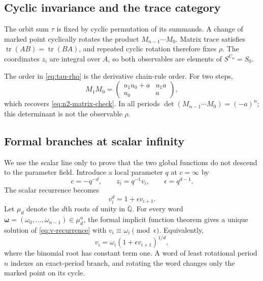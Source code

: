 \documentclass[11pt]{article}
\theoremstyle{definition}
\theoremstyle{remark}
\newcommand{\Qbar}{\overline{\mathbb{Q}}}
\newcommand{\bw}{\boldsymbol{\omega}}
\begin{document}
\subsection{Cyclic invariance and the trace category}

The orbit sum $\tau$ is fixed by cyclic permutation of its summands.  A
change of marked point cyclically rotates the product
$M_{n-1}\cdots M_0$.  Matrix trace satisfies
$\operatorname{tr}(AB)=\operatorname{tr}(BA)$, and repeated cyclic rotation
therefore fixes $\rho$.  The coordinates $z_i$ are integral over $A$, so
both observables are elements of $S^{C_n}=S_0$.

The order in \eqref{eq:tau-rho} is the derivative chain-rule order.  For two
steps,
\[
 M_1M_0=
 \begin{pmatrix}
   u_1u_0+a&u_1a\\
   u_0&a
 \end{pmatrix},
\]
which recovers \eqref{eq:n2-matrix-check}.  In all periods
$\det(M_{n-1}\cdots M_0)=(-a)^n$; this determinant is not the observable
$\rho$.

\subsection{Formal branches at scalar infinity}

We use the scalar line only to prove that the two global functions do not
descend to the parameter field.  Introduce a local parameter $q$ at
$c=\infty$ by
\begin{equation}\label{eq:infinity-substitution}
 c=-q^{-d},\qquad z_i=q^{-1}v_i,\qquad
 \epsilon=q^{d-1}.
\end{equation}
The scalar recurrence becomes
\begin{equation}\label{eq:v-recurrence}
 v_i^d=1+\epsilon v_{i+1}.
\end{equation}
Let $\mu_d$ denote the $d$th roots of unity in $\Qbar$.  For every word
$\bw=(\omega_0,\ldots,\omega_{n-1})\in\mu_d^n$, the formal implicit
function theorem gives a unique solution of \eqref{eq:v-recurrence} with
$v_i\equiv\omega_i\pmod\epsilon$.  Equivalently,
\begin{equation}\label{eq:branch-equation}
 v_i=\omega_i(1+\epsilon v_{i+1})^{1/d},
\end{equation}
where the binomial root has constant term one.  A word of least rotational
period $n$ indexes an exact-period branch, and rotating the word changes
only the marked point on its cycle.
\end{document}
